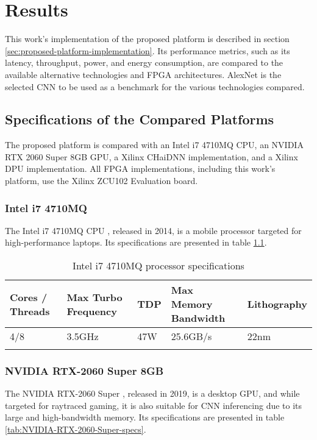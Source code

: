 \chapter{Results}
This work's implementation of the proposed platform is described in section \ref{sec:proposed-platform-implementation}. Its performance metrics, such as its latency, throughput, power, and energy consumption, are compared to the available alternative technologies and FPGA architectures. AlexNet is the selected CNN to be used as a benchmark for the various technologies compared.

\section{Specifications of the Compared Platforms}
The proposed platform is compared with an Intel i7 4710MQ CPU, an NVIDIA RTX 2060 Super 8GB GPU, a Xilinx CHaiDNN implementation, and a Xilinx DPU implementation. All FPGA implementations, including this work's platform, use the Xilinx ZCU102 Evaluation board.

\subsection{Intel i7 4710MQ}
The Intel i7 4710MQ CPU \cite{Intel-i7-4710MQ-Processor}, released in 2014, is a mobile processor targeted for high-performance laptops. Its specifications are presented in table \ref{tab:Intel-i7-4710MQ-specs}.

\begin{table}[H]
	\caption{Intel i7 4710MQ processor specifications}
	\label{tab:Intel-i7-4710MQ-specs}
	\centering
	\begin{tabular}{p{2cm} p{3cm} p{1cm} p{3cm} p{3cm}}
		\toprule
		\textbf{Cores / Threads} & \textbf{Max Turbo Frequency} & \textbf{TDP} & \textbf{Max Memory Bandwidth} & \textbf{Lithography}\\
		\midrule
			4/8 & 3.5GHz & 47W & 25.6GB/s & 22nm\\
		\bottomrule\\
	\end{tabular}
\end{table}

\subsection{NVIDIA RTX-2060 Super 8GB}
The NVIDIA RTX-2060 Super \cite{NVIDIA-RTX-2060-Super}, released in 2019, is a desktop GPU, and while targeted for raytraced gaming, it is also suitable for CNN inferencing due to its large and high-bandwidth memory. Its specifications are presented in table \ref{tab:NVIDIA-RTX-2060-Super-specs}.

